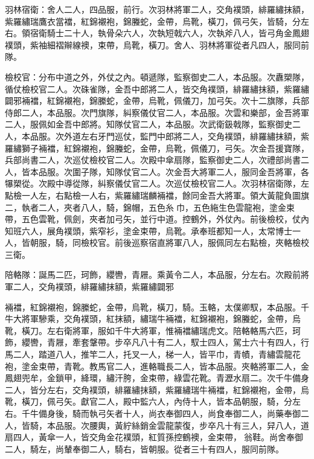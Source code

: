 \begin{pinyinscope}
 羽林宿衛：舍人二人，四品服，前行。次羽林將軍二人，交角襆頭，緋羅繡抹額，紫羅繡瑞鷹衣當襠，紅錦襯袍，錦螣蛇，金帶，烏靴，橫刀，佩弓矢，皆騎，分左右。領宿衛騎士二十人，執骨朵六人，次執短戟六人，次執斧八人，皆弓角金鳳翅襆頭，紫袖細褶辮線襖，束帶，烏靴，橫刀。舍人、羽林將軍從者凡四人，服同前隊。



 檢校官：分布中道之外，外仗之內。頓遞隊，監察御史二人，本品服。次纛槊隊，循仗檢校官二人。次硃雀隊，金吾中郎將二人，皆交角襆頭，緋羅繡抹額，紫羅繡闢邪裲襠，紅錦襯袍，錦縢蛇，金帶，烏靴，佩儀刀，加弓矢。次十二旗隊，兵部侍郎二人，本品服。次門旗隊，糾察儀仗官二人，本品服。次雲和樂部，金吾將軍二人，服佩如金吾中郎將。知隊仗官二人，本品服。次武衛鈒戟隊，監察御史二人，本品服。次外道左右牙門巡仗，監門中郎將二人，交角襆頭，緋羅繡抹額，紫羅繡獅子裲襠，紅錦襯袍，錦螣蛇，金帶，烏靴，佩儀刀，弓矢。次金吾援寶隊，兵部尚書二人，次巡仗檢校官二人。次殿中傘扇隊，監察御史二人，次禮部尚書二人，皆本品服。次圍子隊，知隊仗官二人。次金吾大將軍二人，服同金吾將軍，各犦槊從。次殿中導從隊，糾察儀仗官二人。次巡仗檢校官二人。次羽林宿衛隊，左點檢一人左，右點檢一人右，紫羅繡瑞麟裲襠，餘同金吾大將軍。領大黃龍負圖旗二，執者二人，夾者八人，騎，錦帽，五色糸巾，五色絁生色雲龍袍，塗金束帶，五色雲靴，佩劍，夾者加弓矢，並行中道。控鶴外，外仗內。前後檢校，仗內知班六人，展角襆頭，紫窄衫，塗金束帶，烏靴。承奉班都知一人，太常博士一人，皆朝服，騎，同檢校官。前後巡察宿直將軍八人，服佩同左右點檢，夾輅檢校三衛。



 陪輅隊：誕馬二匹，珂飾，纓轡，青屜。乘黃令二人，本品服，分左右。次殿前將軍二人，交角襆頭，緋羅繡抹額，紫羅繡闢邪



 裲襠，紅錦襯袍，錦縢蛇，金帶，烏靴，橫刀，騎。玉輅，太僕卿馭，本品服。千牛大將軍驂乘，交角襆頭，紅抹額，繡瑞牛裲襠，紅錦襯袍，錦螣蛇，金帶，烏靴，橫刀。左右衛將軍，服如千牛大將軍，惟裲襠繡瑞虎文。陪輅輅馬六匹，珂飾，纓轡，青屜，牽套鞶帶。步卒凡八十有二人，馭士四人，駕士六十有四人，行馬二人，踏道八人，推竿二人，托叉一人，梯一人，皆平巾，青幘，青繡雲龍花袍，塗金束帶，青靴。教馬官二人，進輅職長二人，皆本品服。夾輅將軍二人，金鳳翅兜牟，金鎖甲，絳環，繡汗胯，金束帶，綠雲花靴。青瀝水扇二。次千牛備身二人，皆分左右，交角襆頭，緋羅繡抹額，紫羅繡瑞牛裲襠，紅錦襯袍，金帶，烏靴，橫刀，佩弓矢。獻官二人，殿中監六人，內侍十人，皆本品朝服，騎，分左右。千牛備身後，騎而執弓矢者十人，尚衣奉御四人，尚食奉御二人，尚藥奉御二人，皆騎，本品服。次腰輿，黃紵絲銷金雲龍蒙復，步卒凡十有三人，舁八人，道扇四人，黃傘一人，皆交角金花襆頭，紅質孫控鶴襖，金束帶，翁鞋。尚舍奉御二人，騎左，尚輦奉御二人，騎右，皆朝服。從者三十有四人，服同前隊。




\end{pinyinscope}
